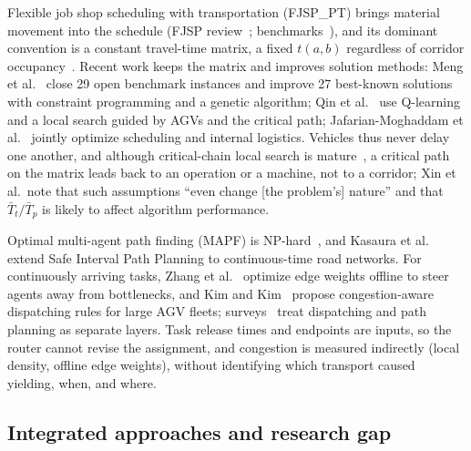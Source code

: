 \documentclass[manuscript,screen,review]{acmart}
\begin{document}
Flexible job shop scheduling with transportation (FJSP\_PT) brings material movement into the schedule (FJSP review~\cite{dauzereperes2024fjsp}; benchmarks~\cite{homayouni2021production}), and its dominant convention is a constant travel-time matrix, a fixed $t(a,b)$ regardless of corridor occupancy~\cite{xin2025review}.
Recent work keeps the matrix and improves solution methods: Meng et al.~\cite{meng2025cp} close 29 open benchmark instances and improve 27 best-known solutions with constraint programming and a genetic algorithm; Qin et al.~\cite{qin2026knowledge} use Q-learning and a local search guided by AGVs and the critical path; Jafarian-Moghaddam et al.~\cite{jafarian2026integrated} jointly optimize scheduling and internal logistics.
Vehicles thus never delay one another, and although critical-chain local search is mature~\cite{otala2021graph,tamssaouet2023neighborhood}, a critical path on the matrix leads back to an operation or a machine, not to a corridor; Xin et al.\ note that such assumptions ``even change [the problem's] nature'' and that $\bar{T}_t/\bar{T}_p$ is likely to affect algorithm performance.

Optimal multi-agent path finding (MAPF) is NP-hard~\cite{gao2023mapf}, and Kasaura et al.~\cite{kasaura2022sipp} extend Safe Interval Path Planning to continuous-time road networks.
For continuously arriving tasks, Zhang et al.~\cite{zhang2024guidance} optimize edge weights offline to steer agents away from bottlenecks, and Kim and Kim~\cite{kim2026congestion} propose congestion-aware dispatching rules for large AGV fleets; surveys~\cite{lu2022agv,fragapane2021planning} treat dispatching and path planning as separate layers.
Task release times and endpoints are inputs, so the router cannot revise the assignment, and congestion is measured indirectly (local density, offline edge weights), without identifying which transport caused yielding, when, and where.

\subsection{Integrated approaches and research gap}
\end{document}
